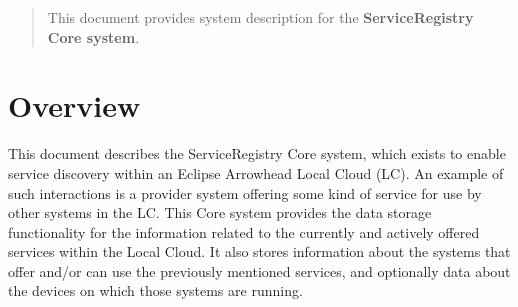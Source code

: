 \documentclass[a4paper]{arrowhead}
\begin{document}
\ArrowheadDate{\today}
\ArrowheadSetup

\begin{center}
  \vspace*{1cm}
  \huge{\arrowtitle}

  \vspace*{0.2cm}
  \LARGE{\arrowtype}
  \vspace*{1cm}

  \vspace*{\fill}


  \vspace*{1cm}
  \vspace*{\fill}

  \begin{abstract}
    This document provides system description for the \textbf{ServiceRegistry Core system}.
  \end{abstract}

  \vspace*{1cm}

 \end{center}

\newpage

\tableofcontents
\newpage

\section{Overview}
\label{sec:overview}
\color{black}
This document describes the ServiceRegistry Core system, which exists to enable service discovery within an Eclipse Arrowhead Local Cloud (LC). An example of such interactions is a provider system offering some kind of service for use by other systems in the LC. This Core system provides the data storage functionality for the information related to the currently and actively offered services within the Local Cloud. It also stores information about the systems that offer and/or can use the previously mentioned services, and optionally data about the devices on which those systems are running.
\end{document}
